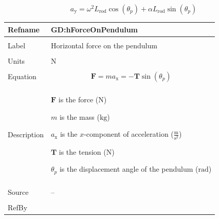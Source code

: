 \documentclass[12pt]{article}
\begin{document}
\begin{displaymath}
{a_{\text{y}}}=ω^{2} {L_{\text{rod}}} \cos\left({θ_{p}}\right)+α {L_{\text{rod}}} \sin\left({θ_{p}}\right)
\end{displaymath}
\vspace{\baselineskip}
\noindent
\begin{minipage}{\textwidth}
\begin{tabular}{>{\raggedright}p{}>{\raggedright\arraybackslash}p{}}
\toprule \textbf{Refname} & \textbf{GD:hForceOnPendulum}
\label{GD:hForceOnPendulum}
\\ \midrule \\
Label & Horizontal force on the pendulum
        
\\ \midrule \\
Units & ${\text{N}}$
        
\\ \midrule \\
Equation & \begin{displaymath}
           \symbf{F}=m {a_{\text{x}}}=-\symbf{T} \sin\left({θ_{p}}\right)
           \end{displaymath}
\\ \midrule \\
Description & \begin{symbDescription}
              \item{$\symbf{F}$ is the force (${\text{N}}$)}
              \item{$m$ is the mass (${\text{kg}}$)}
              \item{${a_{\text{x}}}$ is the $x$-component of acceleration ($\frac{\text{m}}{\text{s}^{2}}$)}
              \item{$\symbf{T}$ is the tension (${\text{N}}$)}
              \item{${θ_{p}}$ is the displacement angle of the pendulum (${\text{rad}}$)}
              \end{symbDescription}
\\ \midrule \\
Source & --
         
\\ \midrule \\
RefBy & 
\\ \bottomrule
\end{tabular}
\end{minipage}
\end{document}
